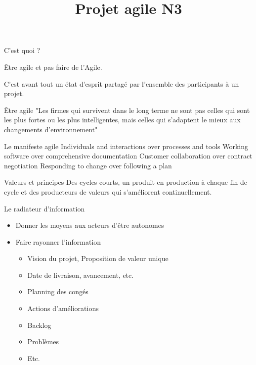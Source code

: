 \documentclass{beamer}
\title{Projet agile N3}
\author{
}
\date{}
\begin{document}
\frame{\titlepage}

\begin{frame}{C'est quoi ?}
 
  {\Large \alert{Être agile} et pas faire de l'Agile.}

  \vspace{6mm}
  C'est avant tout un état d'esprit partagé par l'ensemble des participants à un projet.
\end{frame}

\begin{frame}{Être agile}
  "Les firmes qui survivent dans le long terme ne sont pas celles qui sont les plus fortes ou les plus intelligentes, mais celles qui s'adaptent le mieux aux changements d'environnement"


\end{frame}

\begin{frame}{Le manifeste agile}
  \large
  \alert{Individuals and interactions} over processes and tools\newline
  \alert{Working software} over comprehensive documentation\newline
  \alert{Customer collaboration} over contract negotiation\newline
  \alert{Responding to change} over following a plan
\end{frame}

\begin{frame}{Valeurs et principes}
  \Large Des cycles courts, un produit en production à chaque fin de cycle et des producteurs de valeurs qui s'améliorent continuellement.
\end{frame}

\begin{frame}{Le radiateur d'information}
  \begin{itemize}
    \item Donner les moyens aux acteurs d'être autonomes
    \item Faire rayonner l'information
    
    \begin{itemize}
      \item Vision du projet, Proposition de valeur unique
      \item Date de livraison, avancement, etc.
      \item Planning des congés
      \item Actions d'améliorations
      \item Backlog
      \item Problèmes
      \item Etc.
    \end{itemize}
  \end{itemize}
\end{frame}
\end{document}
